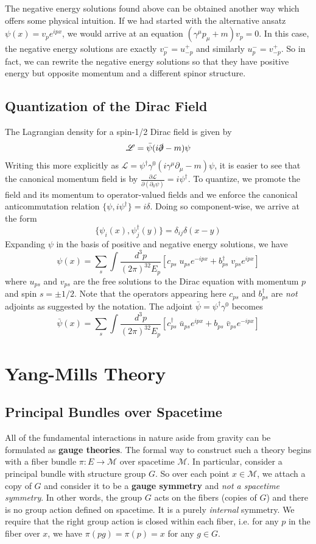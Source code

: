 \documentclass[onecolumn]{gwclass}
\begin{document}
The negative energy solutions found above can be obtained another way which offers some physical intuition. If we had started with the alternative ansatz $\psi(x)=v_pe^{ipx}$, we would arrive at an equation $(\gamma^\mu p_\mu +m )v_p=0$. In this case, the negative energy solutions are exactly $v_p^- = u_{-p}^+$ and similarly $u_p^- = v_{-p}^+$. So in fact, we can rewrite the negative energy solutions so that they have positive energy but opposite momentum and a different spinor structure.


\subsection{Quantization of the Dirac Field}
The Lagrangian density for a spin-1/2 Dirac field is given by
$$ \mathscr{L} = \bar{\psi}(i\slashed{\partial} - m)\psi  $$
Writing this more explicitly as $\mathscr{L} = \psi^\dagger\gamma^0(i\gamma^\mu\partial_\mu - m)\psi$, it is easier to see that the canonical momentum field is by $\frac{\partial\mathscr{L}}{\partial(\partial_0 \psi)}=i\psi^\dagger$. To quantize, we promote the field and its momentum to operator-valued fields and we enforce the canonical anticommutation relation $\{\psi, i\psi^\dagger\}=i\delta$. Doing so component-wise, we arrive at the form
$$ \{\psi_i(x), \psi_j^\dagger(y)\} = \delta_{ij}\delta(x-y) $$
Expanding $\psi$ in the basis of positive and negative energy solutions, we have
$$ \psi(x) = \sum_s \int\frac{d^3p}{(2\pi)^32E_p}\left[ c_{ps}\;u_{ps} e^{-ipx} + b_{ps}^\dagger\;v_{ps} e^{ipx} \right] $$
where $u_{ps}$ and $v_{ps}$ are the free solutions to the Dirac equation with momentum $p$ and spin $s=\pm 1/2$. Note that the operators appearing here $c_{ps}$ and $b_{ps}^\dagger$ are \emph{not} adjoints as suggested by the notation. The adjoint $\bar{\psi}=\psi^\dagger\gamma^0$ becomes
$$ \bar{\psi}(x) = \sum_s \int\frac{d^3p}{(2\pi)^32E_p}\left[ c^\dagger_{ps}\;\bar{u}_{ps} e^{ipx} + b_{ps}\;\bar{v}_{ps} e^{-ipx} \right] $$



\newpage

\section{Yang-Mills Theory}
\subsection{Principal Bundles over Spacetime}
All of the fundamental interactions in nature aside from gravity can be formulated as \textbf{gauge theories}. The formal way to construct such a theory begins with a fiber bundle $\pi:E\to\mathcal{M}$ over spacetime $\mathcal{M}$. In particular, consider a principal bundle with structure group $G$. So over each point $x\in\mathcal{M}$, we attach a copy of $G$ and consider it to be a \textbf{gauge symmetry} and \emph{not a spacetime symmetry}. In other words, the group $G$ acts on the fibers (copies of $G$) and there is no group action defined on spacetime. It is a purely \emph{internal} symmetry. We require that the right group action is closed within each fiber, i.e. for any $p$ in the fiber over $x$, we have $\pi(pg)=\pi(p)=x$ for any $g\in G$.
\end{document}

